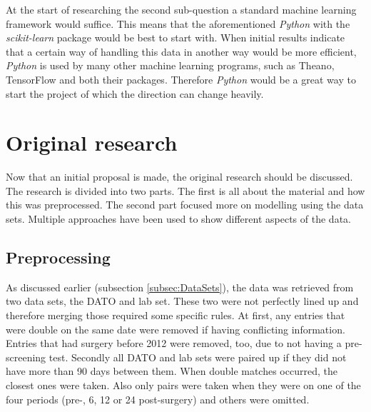 \documentclass[10pt,a4paper]{report}
\begin{document}
	At the start of researching the second sub-question a standard machine learning framework would suffice. This means that the aforementioned \textit{Python} with the \textit{scikit-learn} package would be best to start with. When initial results indicate that a certain way of handling this data in another way would be more efficient, \textit{Python} is used by many other machine learning programs, such as Theano, TensorFlow and both their packages. Therefore \textit{Python} would be a great way to start the project of which the direction can change heavily.
	
	\clearpage
	
	\section{Original research}
	\label{sec:OriginalResearch}
	
	Now that an initial proposal is made, the original research should be discussed. The research is divided into two parts. The first is all about the material and how this was preprocessed. The second part focused more on modelling using the data sets. Multiple approaches have been used to show different aspects of the data.
	
	\subsection{Preprocessing}
	\label{subsec:Preprocessing}
	
	As discussed earlier (subsection \ref{subsec:DataSets}), the data was retrieved from two data sets, the DATO and lab set. These two were not perfectly lined up and therefore merging those required some specific rules. At first, any entries that were double on the same date were removed if having conflicting information. Entries that had surgery before 2012 were removed, too, due to not having a pre-screening test. Secondly all DATO and lab sets were paired up if they did not have more than 90 days between them. When double matches occurred, the closest ones were taken. Also only pairs were taken when they were on one of the four periods (pre-, 6, 12 or 24 post-surgery) and others were omitted.
	
\end{document}
